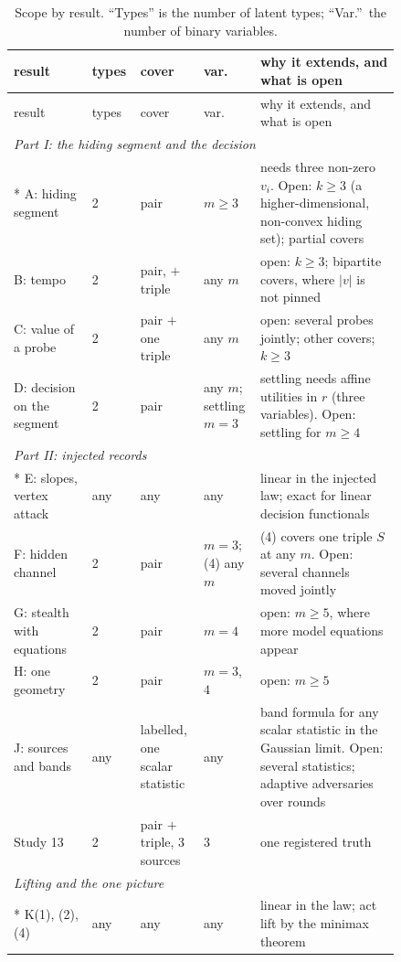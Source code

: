 \documentclass[11pt]{article}
\theoremstyle{definition}\newtheorem{definition}{Definition}\newtheorem{remark}{Remark}
\begin{document}
{\small\renewcommand{\arraystretch}{1.12}
\begin{longtable}{p{0.19\linewidth}p{0.06\linewidth}p{0.15\linewidth}p{0.1\linewidth}p{0.34\linewidth}}
\caption{Scope by result. ``Types'' is the number of latent types; ``Var.''\ the number of binary variables.}\label{tab:scope}\\\toprule
result & types & cover & var. & why it extends, and what is open\\\midrule\endfirsthead
\toprule result & types & cover & var. & why it extends, and what is open\\\midrule\endhead
\multicolumn{5}{l}{\emph{Part I: the hiding segment and the decision}}\\*
A: hiding segment & 2 & pair & $m\ge3$ & needs three non-zero $v_i$. Open: $k\ge3$ (a higher-dimensional, non-convex hiding set); partial covers\\
B: tempo & 2 & pair, $+$triple & any $m$ & open: $k\ge3$; bipartite covers, where $|v|$ is not pinned\\
C: value of a probe & 2 & pair $+$ one triple & any $m$ & open: several probes jointly; other covers; $k\ge3$\\
D: decision on the segment & 2 & pair & any $m$; settling $m=3$ & settling needs affine utilities in $r$ (three variables). Open: settling for $m\ge4$\\[3pt]
\multicolumn{5}{l}{\emph{Part II: injected records}}\\*
E: slopes, vertex attack & any & any & any & linear in the injected law; exact for linear decision functionals\\
F: hidden channel & 2 & pair & $m=3$; (4) any $m$ & (4) covers one triple $S$ at any $m$. Open: several channels moved jointly\\
G: stealth with equations & 2 & pair & $m=4$ & open: $m\ge5$, where more model equations appear\\
H: one geometry & 2 & pair & $m=3$, $4$ & open: $m\ge5$\\
J: sources and bands & any & labelled, one scalar statistic & any & band formula for any scalar statistic in the Gaussian limit. Open: several statistics; adaptive adversaries over rounds\\
Study 13 & 2 & pair $+$ triple, 3 sources & 3 & one registered truth\\[3pt]
\multicolumn{5}{l}{\emph{Lifting and the one picture}}\\*
K(1), (2), (4) & any & any & any & linear in the law; act lift by the minimax theorem\\

\end{longtable}}
\end{document}
